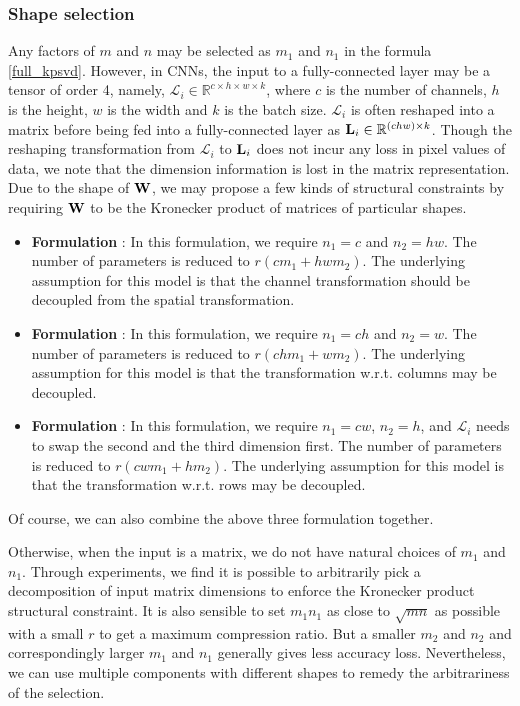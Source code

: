 \documentclass{article}
\def\L{{\bf L}}
\def\W{{\bf W}}
\def\RB{{\mathbb R}}
\begin{document}
\subsubsection{Shape selection}
Any factors of $m$ and $n$ may be selected as $m_1$ and $n_1$ in the formula \ref{full_kpsvd}. However, in CNNs, the input to a fully-connected layer may be a tensor of order 4, namely, $\mathcal{L}_{i}\in \RB^{c \times h \times w \times k}$, where $c$ is the number of channels, $h$ is the height, $w$ is the  width and $k$ is the batch size. $\mathcal{L}_i$ is often reshaped into a matrix before being fed into a fully-connected layer as $\L_{i} \in \RB^{(chw) \times k}$. Though the reshaping transformation from $\mathcal{L}_{i}$ to $\L_{i}$ does not incur any loss in pixel values of data, we note that the dimension information is lost in the matrix representation. Due to the shape of $\W$, we may propose a few kinds of structural constraints by requiring $\W$ to be the Kronecker product of matrices of particular shapes.
\begin{itemize}
\item \textbf{Formulation \uppercase\expandafter{}}: In this formulation, we require $n_1=c$ and $n_2=hw$. The number of parameters is reduced to $r(cm_1 + hwm_2)$. The underlying assumption for this model is that the channel transformation should be decoupled from the spatial transformation.
\item \textbf{Formulation \uppercase\expandafter{}}: In this formulation, we require $n_1 = ch$ and $n_2=w$. The number of parameters is reduced to $r(chm_1 + wm_2)$. The underlying assumption for this model is that the transformation w.r.t. columns may be decoupled.
\item \textbf{Formulation \uppercase\expandafter{}}: In this formulation, we require $n_1 = cw$,  $n_2=h$, and $\mathcal{L}_{i}$ needs to swap the second and the third dimension first. The number of parameters is reduced to $r(cwm_1 + hm_2)$. The underlying assumption for this model is that the transformation w.r.t. rows may be decoupled.
\end{itemize}
Of course, we can also combine the above three formulation together.

Otherwise, when the input is a matrix, we do not have natural choices of $m_1$ and $n_1$. Through experiments, we find it is possible to arbitrarily pick a decomposition of input matrix dimensions to enforce the Kronecker product structural constraint. It is also sensible to set $m_1n_1$ as close to $\sqrt{mn}$ as possible with a small $r$ to get a maximum compression ratio. But a smaller $m_2$ and $n_2$ and correspondingly larger $m_1$ and $n_1$ generally gives less accuracy loss. Nevertheless, we can use multiple components with different shapes to remedy the arbitrariness of the selection.
\end{document}
